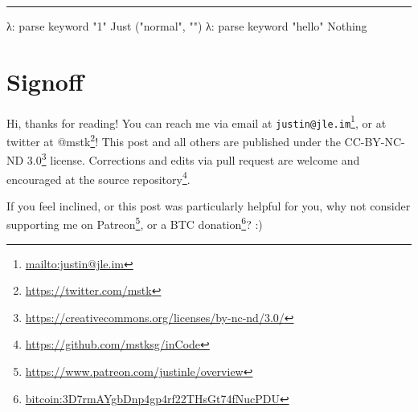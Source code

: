 \documentclass[]{article}
\newenvironment{Shaded}{}{}
\newcommand{\DataTypeTok}[1]{\textcolor[rgb]{0.56,0.13,0.00}{#1}}
\newcommand{\NormalTok}[1]{#1}
\newcommand{\OperatorTok}[1]{\textcolor[rgb]{0.40,0.40,0.40}{#1}}
\newcommand{\StringTok}[1]{\textcolor[rgb]{0.25,0.44,0.63}{#1}}
\renewcommand{\href}[2]{#2\footnote{\url{#1}}}
\begin{document}
\begin{center}\rule{0.5\linewidth}{\linethickness}\end{center}

\begin{Shaded}
\begin{Highlighting}[]
\NormalTok{λ}\OperatorTok{:}\NormalTok{ parse keyword }\StringTok{"1"}
\DataTypeTok{Just}\NormalTok{ (}\StringTok{"normal"}\NormalTok{, }\StringTok{""}\NormalTok{)}
\NormalTok{λ}\OperatorTok{:}\NormalTok{ parse keyword }\StringTok{"hello"}
\DataTypeTok{Nothing}
\end{Highlighting}
\end{Shaded}

\hypertarget{signoff}{%
\section{Signoff}\label{signoff}}

Hi, thanks for reading! You can reach me via email at
\href{mailto:justin@jle.im}{\nolinkurl{justin@jle.im}}, or at twitter at
\href{https://twitter.com/mstk}{@mstk}! This post and all others are published
under the \href{https://creativecommons.org/licenses/by-nc-nd/3.0/}{CC-BY-NC-ND
3.0} license. Corrections and edits via pull request are welcome and encouraged
at \href{https://github.com/mstksg/inCode}{the source repository}.

If you feel inclined, or this post was particularly helpful for you, why not
consider \href{https://www.patreon.com/justinle/overview}{supporting me on
Patreon}, or a \href{bitcoin:3D7rmAYgbDnp4gp4rf22THsGt74fNucPDU}{BTC donation}?
:)
\end{document}
